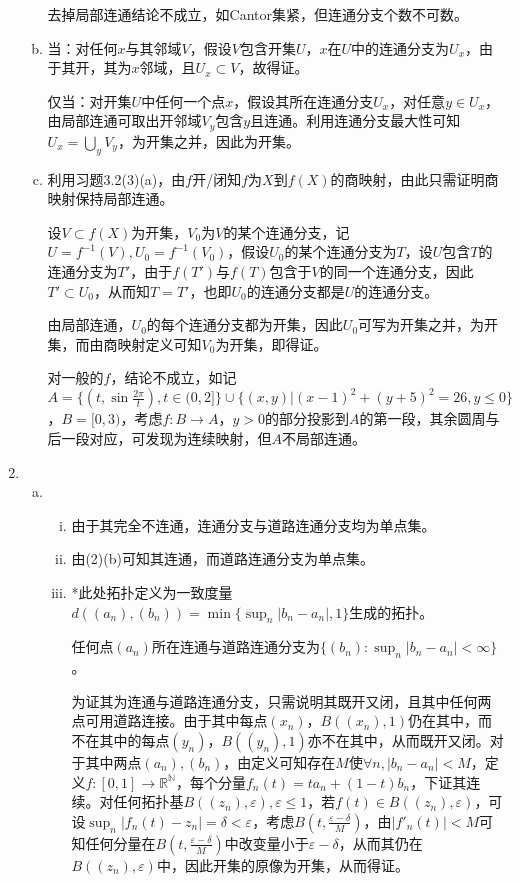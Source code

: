 \documentclass[a4paper,UTF8,fontset=windows]{ctexart}
\begin{document}
\begin{enumerate}[(1)]
\begin{enumerate}[(a)]
    去掉局部连通结论不成立，如Cantor集紧，但连通分支个数不可数。
    
    \item
    当：对任何$x$与其邻域$V$，假设$V$包含开集$U$，$x$在$U$中的连通分支为$U_x$，由于其开，其为$x$邻域，且$U_x\subset V$，故得证。
    
    仅当：对开集$U$中任何一个点$x$，假设其所在连通分支$U_x$，对任意$y\in U_x$，由局部连通可取出开邻域$V_y$包含$y$且连通。利用连通分支最大性可知$U_x=\bigcup_yV_y$，为开集之并，因此为开集。
    
    \item
    利用习题3.2(3)(a)，由$f$开/闭知$f$为$X$到$f(X)$的商映射，由此只需证明商映射保持局部连通。
    
    设$V\subset f(X)$为开集，$V_0$为$V$的某个连通分支，记$U=f^{-1}(V),U_0=f^{-1}(V_0)$，假设$U_0$的某个连通分支为$T$，设$U$包含$T$的连通分支为$T'$，由于$f(T')$与$f(T)$包含于$V$的同一个连通分支，因此$T'\subset U_0$，从而知$T=T'$，也即$U_0$的连通分支都是$U$的连通分支。
    
    由局部连通，$U_0$的每个连通分支都为开集，因此$U_0$可写为开集之并，为开集，而由商映射定义可知$V_0$为开集，即得证。
    
    对一般的$f$，结论不成立，如记$A=\{(t,\sin\frac{2\pi}{t}),t\in(0,2]\}\cup\{(x,y)|(x-1)^2+(y+5)^2=26,y\le0\}$，$B=[0,3)$，考虑$f:B\to A$，$y>0$的部分投影到$A$的第一段，其余圆周与后一段对应，可发现为连续映射，但$A$不局部连通。
    \end{enumerate}
    
    \item
    \begin{enumerate}[(a)]
    \item
    \begin{enumerate}[(i)]
    \item
    由于其完全不连通，连通分支与道路连通分支均为单点集。
    
    \item
    由(2)(b)可知其连通，而道路连通分支为单点集。
    
    \item
    *此处拓扑定义为一致度量$d((a_n),(b_n))=\min\{\sup_n|b_n-a_n|,1\}$生成的拓扑。
    
    任何点$(a_n)$所在连通与道路连通分支为$\{(b_n):\sup_n|b_n-a_n|<\infty\}$。
    
    为证其为连通与道路连通分支，只需说明其既开又闭，且其中任何两点可用道路连接。由于其中每点$(x_n)$，$B((x_n),1)$仍在其中，而不在其中的每点$(y_n)$，$B((y_n),1)$亦不在其中，从而既开又闭。对于其中两点$(a_n),(b_n)$，由定义可知存在$M$使$\forall n,|b_n-a_n|<M$，定义$f:[0,1]\to\mathbb{R}^\mathbb{N}$，每个分量$f_n(t)=ta_n+(1-t)b_n$，下证其连续。对任何拓扑基$B((z_n),\varepsilon),\varepsilon\le1$，若$f(t)\in B((z_n),\varepsilon)$，可设$\sup_n|f_n(t)-z_n|=\delta<\varepsilon$，考虑$B(t,\frac{\varepsilon-\delta}{M})$，由$|f'_n(t)|<M$可知任何分量在$B(t,\frac{\varepsilon-\delta}{M})$中改变量小于$\varepsilon-\delta$，从而其仍在$B((z_n),\varepsilon)$中，因此开集的原像为开集，从而得证。
    

\end{enumerate}
\end{enumerate}
\end{enumerate}
\end{document}
